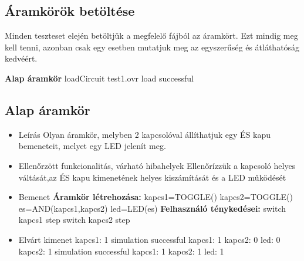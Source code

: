 \subsection{Áramkörök betöltése}
\begin{itemize}
Minden teszteset elején betöltjük a megfelelő fájból az áramkört. Ezt mindig meg kell tenni, azonban csak egy esetben mutatjuk meg az egyszerűség és átláthatóság kedvéért.

\textbf{Alap áramkör}\newline
loadCircuit test1.ovr\newline
\newline
load successful

\end{itemize}


\subsection{Alap áramkör}
\begin{itemize}
\item Leírás\newline
Olyan áramkör, melyben 2 kapcsolóval állíthatjuk egy ÉS kapu bemeneteit, melyet egy LED jelenít meg.
\item Ellenőrzött funkcionalitás, várható hibahelyek\newline
Ellenőrízzük a kapcsoló helyes váltását,az ÉS kapu kimenetének helyes kiszámítását és a LED működését
\item Bemenet\newline
\newline
{\bf Áramkör létrehozása:}\newline
kapcs1=TOGGLE()\newline
kapcs2=TOGGLE()\newline
es=AND(kapcs1,kapcs2)\newline
led=LED(es)\newline
{\bf Felhasználó ténykedései:}\newline
switch kapcs1
step
switch kapcs2
step
\item Elvárt kimenet\newline
kapcs1: 1\newline
simulation successful\newline
kapcs1: 1\newline
kapcs2: 0\newline
led: 0\newline
kapcs2: 1\newline
simulation successful\newline
kapcs1: 1\newline
kapcs2: 1\newline
led: 1\newline
\end{itemize}

